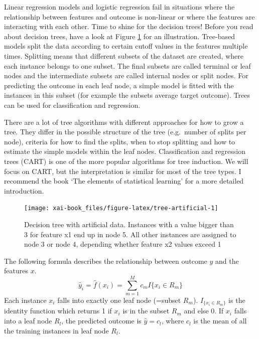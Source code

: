 \documentclass[12pt,]{krantz}
\theoremstyle{definition}
\theoremstyle{definition}
\theoremstyle{definition}
\theoremstyle{remark}
\begin{document}
Linear regression models and logistic regression fail in situations
where the relationship between features and outcome is non-linear or
where the features are interacting with each other. Time to shine for
the decision trees! Before you read about decision trees, have a look at
Figure \ref{fig:tree-artificial} for an illustration. Tree-based models
split the data according to certain cutoff values in the features
multiple times. Splitting means that different subsets of the dataset
are created, where each instance belongs to one subset. The final
subsets are called terminal or leaf nodes and the intermediate subsets
are called internal nodes or split nodes. For predicting the outcome in
each leaf node, a simple model is fitted with the instances in this
subset (for example the subsets average target outcome). Trees can be
used for classification and regression.

There are a lot of tree algorithms with different approaches for how to
grow a tree. They differ in the possible structure of the tree
(e.g.~number of splits per node), criteria for how to find the splits,
when to stop splitting and how to estimate the simple models within the
leaf nodes. Classification and regression trees (CART) is one of the
more popular algorithms for tree induction. We will focus on CART, but
the interpretation is similar for most of the tree types. I recommend
the book `The elements of statistical learning' \citep{Hastie2009} for a
more detailed introduction.

\begin{figure}

{\centering \texttt{[image: xai-book\_files/figure-latex/tree-artificial-1]} 

}

\caption{Decision tree with artificial data. Instances with a value bigger than 3 for feature x1 end up in node 5. All other instances are assigned to node 3 or node 4, depending whether feature x2 values exceed 1}\label{fig:tree-artificial}
\end{figure}

The following formula describes the relationship between outcome \(y\)
and the features \(x\).
\[\hat{y}_i = \hat{f}(x_i) = \sum_{m = 1}^M c_m I\{x_i \in R_m\}\] Each
instance \(x_i\) falls into exactly one leaf node (=subset \(R_m\)).
\(I_{\{x_i \in R_m\}}\) is the identity function which returns 1 if
\(x_i\) is in the subset \(R_m\) and else 0. If \(x_i\) falls into a
leaf node \(R_l\), the predicted outcome is \(\hat{y} = c_l\), where
\(c_l\) is the mean of all the training instances in leaf node \(R_l\).
\end{document}

